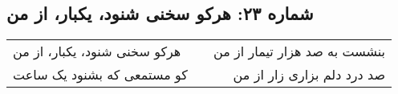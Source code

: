 \begin{center}
\section*{شماره ۲۳: هرکو سخنی شنود، یکبار، از من}
\label{sec:023}
\begin{longtable}{l p{0.5cm} r}
هرکو سخنی شنود، یکبار، از من
&&
بنشست به صد هزار تیمار از من
\\
کو مستمعی که بشنود یک ساعت
&&
صد درد دلم بزاری زار از من
\\
\end{longtable}
\end{center}
